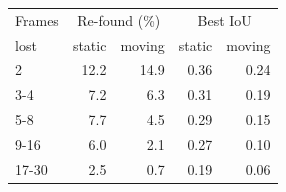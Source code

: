 \begin{tabular}{lrrrr}
\toprule
Frames & \multicolumn{2}{c}{Re-found (\%)} & \multicolumn{2}{c}{Best IoU} \\
lost & static & moving & static & moving \\
\midrule
2 & 12.2 & 14.9 & 0.36 & 0.24 \\
3-4 & 7.2 & 6.3 & 0.31 & 0.19 \\
5-8 & 7.7 & 4.5 & 0.29 & 0.15 \\
9-16 & 6.0 & 2.1 & 0.27 & 0.10 \\
17-30 & 2.5 & 0.7 & 0.19 & 0.06 \\
\bottomrule
\end{tabular}

